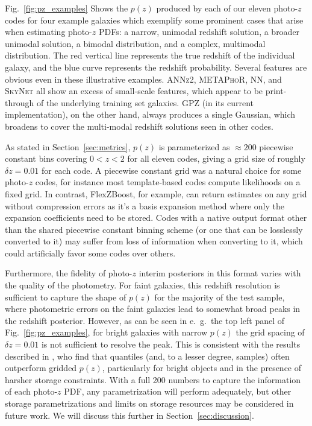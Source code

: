 Fig.~\ref{fig:pz_examples} Shows the $p(z)$ produced by each of our eleven photo-$z$ codes for four example galaxies which exemplify some prominent cases that arise when estimating photo-$z$ PDFs: a narrow, unimodal redshift solution, a broader unimodal solution, a bimodal distribution, and a complex, multimodal distribution.
The red vertical line represents the true redshift of the individual galaxy, and the blue curve represents the redshift probability.
Several features are obvious even in these illustrative examples.
\textsc{ANNz2, METAPhoR, NN,} and \textsc{SkyNet} all show an excess of small-scale features, which appear to be print-through of the underlying training set galaxies.
\textsc{GPZ} (in its current implementation), on the other hand, always produces a single Gaussian, which broadens to cover the multi-modal redshift solutions seen in other codes.

As stated in Section~\ref{sec:metrics}, $p(z)$ is parameterized as $\approx 200$ piecewise constant bins covering $0<z<2$ for all eleven codes, giving a grid size of roughly $\delta z = 0.01$ for each code.
A piecewise constant grid was a natural choice for some photo-$z$ codes, for instance most template-based codes compute likelihoods on a fixed grid.
In contrast, FlexZBoost, for example, can return estimates on any grid without compression errors as it’s a basis expansion method where only the expansion coefficients need to be stored.
Codes with a native output format other than the shared piecewise constant binning scheme (or one that can be losslessly converted to it) may suffer from loss of information when converting to it, which could artificially favor some codes over others.

Furthermore, the fidelity of photo-$z$ interim posteriors in this format varies with the quality of the photometry.
For faint galaxies, this redshift resolution is sufficient to capture the shape of $p(z)$ for the majority of the test sample, where photometric errors on the faint galaxies lead to somewhat broad peaks in the redshift posterior.
However, as can be seen in e.~g.~the top left panel of Fig.~\ref{fig:pz_examples}, for bright galaxies with narrow $p(z)$ the grid spacing of $\delta z = 0.01$ is not sufficient to resolve the peak.
This is consistent with the results described in \citet[]{Malz:qp}, who find that quantiles (and, to a lesser degree, samples) often outperform gridded $p(z)$, particularly for bright objects and in the presence of harsher storage constraints.
With a full 200 numbers to capture the information of each photo-$z$ PDF, any parametrization will perform adequately, but other storage parametrizations and limits on storage resources may be considered in future work.
We will discuss this further in Section~\ref{sec:discussion}.

